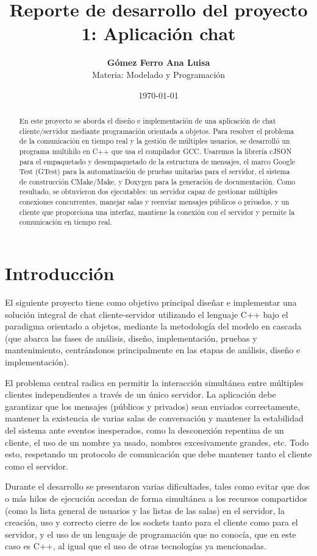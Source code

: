 \documentclass[11pt,a4paper]{article}
\title{\textbf{Reporte de desarrollo del proyecto 1: Aplicación chat}}
\author{\textbf{Gómez Ferro Ana Luisa} \\ 
Materia: Modelado y Programación}
\date{\today}
\begin{document}
\maketitle

\begin{abstract}
En este proyecto se aborda el diseño e implementación de una aplicación de chat cliente/servidor mediante programación orientada a objetos. Para resolver el problema de la comunicación en tiempo real y la gestión de múltiples usuarios, se desarrolló un programa multihilo en C++ que usa el compilador GCC. Usaremos la librería cJSON para el empaquetado y desempaquetado de la estructura de mensajes, el marco Google Test (GTest) para la automatización de pruebas unitarias para el servidor, el sistema de construcción CMake/Make, y Doxygen para la generación de documentación. Como resultado, se obtuvieron dos ejecutables: un servidor capaz de gestionar múltiples conexiones concurrentes, manejar salas y reenviar mensajes públicos o privados, y un cliente que proporciona una interfaz, mantiene la conexión con el servidor y permite la comunicación en tiempo real.
\end{abstract}

\section{Introducción}

El siguiente proyecto tiene como objetivo principal diseñar e implementar una solución integral de chat cliente-servidor utilizando el lenguaje C++ bajo el paradigma orientado a objetos, mediante la metodología del modelo en cascada (que abarca las fases de análisis, diseño, implementación, pruebas y mantenimiento, centrándonos principalmente en las etapas de análisis, diseño e implementación).

El problema central radica en permitir la interacción simultánea entre múltiples clientes independientes a través de un único servidor. La aplicación debe garantizar que los mensajes (públicos y privados) sean enviados correctamente, mantener la existencia de varias salas de conversación y mantener la estabilidad del sistema ante eventos inesperados, como la desconexión repentina de un cliente, el uso de un nombre ya usado, nombres excesivamente grandes, etc. Todo esto, respetando un protocolo de comunicación que debe mantener tanto el cliente como el servidor.

Durante el desarrollo se presentaron varias dificultades, tales como evitar que dos o más hilos de ejecución accedan de forma simultánea a los recursos compartidos (como la lista general de usuarios y las listas de las salas) en el servidor, la creación, uso y correcto cierre de los sockets tanto para el cliente como para el servidor, y el uso de un lenguaje de programación que no conocía, que en este caso es C++, al igual que el uso de otras tecnologías ya mencionadas.
\end{document}
